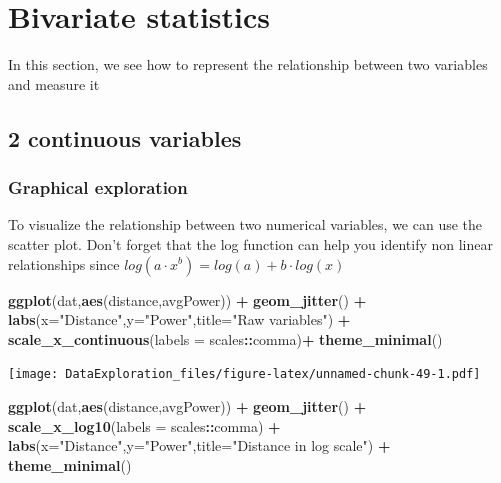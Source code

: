 \documentclass[
]{book}
\newenvironment{Shaded}{\begin{snugshade}}{\end{snugshade}}
\newcommand{\DataTypeTok}[1]{\textcolor[rgb]{0.13,0.29,0.53}{#1}}
\newcommand{\KeywordTok}[1]{\textcolor[rgb]{0.13,0.29,0.53}{\textbf{#1}}}
\newcommand{\NormalTok}[1]{#1}
\newcommand{\OperatorTok}[1]{\textcolor[rgb]{0.81,0.36,0.00}{\textbf{#1}}}
\newcommand{\StringTok}[1]{\textcolor[rgb]{0.31,0.60,0.02}{#1}}
\begin{document}
\hypertarget{bivariate-statistics}{%
\section{Bivariate statistics}\label{bivariate-statistics}}

In this section, we see how to represent the relationship between two variables and measure it

\hypertarget{continuous-variables}{%
\subsection{2 continuous variables}\label{continuous-variables}}

\hypertarget{graphical-exploration}{%
\subsubsection{Graphical exploration}\label{graphical-exploration}}

To visualize the relationship between two numerical variables, we can use the scatter plot. Don't forget that the log function can help you identify non linear relationships since \(log(a \cdot x^b) = log(a) + b \cdot log(x)\)

\begin{Shaded}
\begin{Highlighting}[]
\KeywordTok{ggplot}\NormalTok{(dat,}\KeywordTok{aes}\NormalTok{(distance,avgPower)) }\OperatorTok{+}\StringTok{ }\KeywordTok{geom_jitter}\NormalTok{() }\OperatorTok{+}\StringTok{ }
\StringTok{  }\KeywordTok{labs}\NormalTok{(}\DataTypeTok{x=}\StringTok{"Distance"}\NormalTok{,}\DataTypeTok{y=}\StringTok{"Power"}\NormalTok{,}\DataTypeTok{title=}\StringTok{"Raw variables"}\NormalTok{) }\OperatorTok{+}\StringTok{ }\KeywordTok{scale_x_continuous}\NormalTok{(}\DataTypeTok{labels =}\NormalTok{ scales}\OperatorTok{::}\NormalTok{comma)}\OperatorTok{+}\StringTok{ }\KeywordTok{theme_minimal}\NormalTok{()}
\end{Highlighting}
\end{Shaded}

\texttt{[image: DataExploration\_files/figure-latex/unnamed-chunk-49-1.pdf]}

\begin{Shaded}
\begin{Highlighting}[]
\KeywordTok{ggplot}\NormalTok{(dat,}\KeywordTok{aes}\NormalTok{(distance,avgPower)) }\OperatorTok{+}\StringTok{ }\KeywordTok{geom_jitter}\NormalTok{() }\OperatorTok{+}\StringTok{ }\KeywordTok{scale_x_log10}\NormalTok{(}\DataTypeTok{labels =}\NormalTok{ scales}\OperatorTok{::}\NormalTok{comma) }\OperatorTok{+}\StringTok{ }
\StringTok{  }\KeywordTok{labs}\NormalTok{(}\DataTypeTok{x=}\StringTok{"Distance"}\NormalTok{,}\DataTypeTok{y=}\StringTok{"Power"}\NormalTok{,}\DataTypeTok{title=}\StringTok{"Distance in log scale"}\NormalTok{) }\OperatorTok{+}\StringTok{ }\KeywordTok{theme_minimal}\NormalTok{()}
\end{Highlighting}
\end{Shaded}
\end{document}
